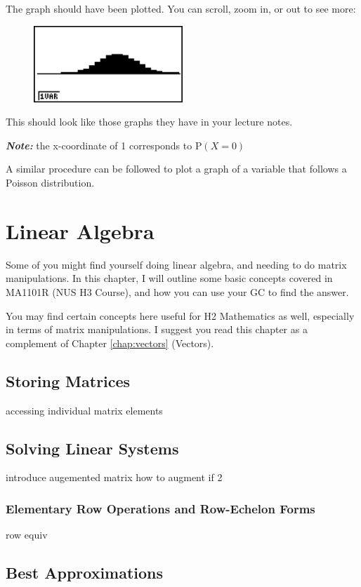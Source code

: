 \documentclass[a5paper]{memoir}
\def\note#1{\textcolor[HTML]{109fa9}{\textbf{\textit{Note:}}} #1}
\begin{document}
The graph should have been plotted. You can scroll, zoom in, or out to see more:

\begin{figure}[h]
	\centering
	\includegraphics[width=0.5\textwidth]{binom50plot}
\end{figure}

This should look like those graphs they have in your lecture notes.

\note{the x-coordinate of 1 corresponds to $\text{P}(X=0)$}

A similar procedure can be followed to plot a graph of a variable that follows a Poisson distribution.

\chapter{Linear Algebra} \label{chap:linalge}
Some of you might find yourself doing linear algebra, and needing to do matrix manipulations. In this chapter, I will outline some basic concepts covered in MA1101R (NUS H3 Course), and how you can use your GC to find the answer.

You may find certain concepts here useful for H2 Mathematics as well, especially in terms of matrix manipulations. I suggest you read this chapter as a complement of Chapter \ref{chap:vectors} (Vectors). 

\section{Storing Matrices}
accessing individual matrix elements

\section{Solving Linear Systems} \label{sec:solvLinSys}
introduce augemented matrix
how to augment if 2

\subsection{Elementary Row Operations and Row-Echelon Forms}
row equiv

\section{Best Approximations} \label{sec:bestapprox}

\cleardoublepage
\printindex
\end{document}
